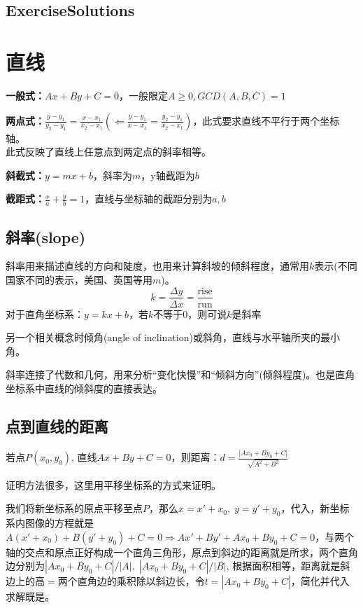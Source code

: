 \documentclass[../main.tex]{subfiles}
\begin{document}
\clearpage
\subsection{ExerciseSolutions}
\printsolutions[section=true]

\clearpage
\section{直线}
\textbf{一般式：}$Ax+By+C=0$，一般限定$A\ge 0, GCD(A,B,C)=1$

\textbf{两点式：}$\displaystyle \frac{y-y_1}{y_2-y_1}=\frac{x-x_1}{x_2-x_1} \left( \Leftarrow \frac{y-y_1}{x-x_1}=\frac{y_2-y_1}{x_2-x_1}\right)$，此式要求直线不平行于两个坐标轴。\\
\phantom{四个汉字}此式反映了直线上任意点到两定点的斜率相等。

\textbf{斜截式：}$y=mx+b$，斜率为$m$，y轴截距为$b$

\textbf{截距式：}$\displaystyle \frac{x}{a}+\frac{y}{b}=1$，直线与坐标轴的截距分别为$a,b$

\subsection{斜率(slope)}
斜率用来描述直线的方向和陡度，也用来计算斜坡的倾斜程度，通常用$k$表示(不同国家不同的表示，美国、英国等用$m$)。
\[
  k=\frac{\Delta y}{\Delta x} = \frac{\text{rise}}{\text{run}}
\]
对于直角坐标系：$y=kx+b$，若$k$不等于$0$，则可说$k$是斜率

另一个相关概念时倾角(angle of inclination)或斜角，直线与水平轴所夹的最小角。

斜率连接了代数和几何，用来分析“变化快慢”和“倾斜方向”(倾斜程度)。也是直角坐标系中直线的倾斜度的直接表达。

\subsection{点到直线的距离}
若点$P(x_0,y_0)$, 直线$Ax+By+C=0$，则距离：$\displaystyle  d=\frac{|Ax_0+By_0+C|}{\sqrt{A^2+B^2}}$

证明方法很多，这里用平移坐标系的方式来证明。

我们将新坐标系的原点平移至点$P$，那么$x=x'+x_0, \; y=y'+y_0$，代入，新坐标系内图像的方程就是$A(x'+x_0)+B(y'+y_0)+C=0 \Rightarrow Ax'+By'+Ax_0+By_0+C=0$，与两个轴的交点和原点正好构成一个直角三角形，原点到斜边的距离就是所求，两个直角边分别为$|Ax_0+By_0+C|/|A|, \; |Ax_0+By_0+C|/|B|$, 根据面积相等，距离就是斜边上的高$=$两个直角边的乘积除以斜边长，令$t=|Ax_0+By_0+C|$，简化并代入求解既是。
\end{document}
